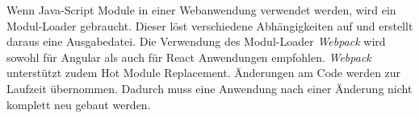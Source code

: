 \label{Webpack}
Wenn Java-Script Module in einer Webanwendung verwendet werden, wird ein Modul-Loader gebraucht. Dieser löst verschiedene Abhängigkeiten auf und erstellt daraus eine Ausgabedatei. Die Verwendung des Modul-Loader \textit{Webpack} wird sowohl für Angular als auch für React Anwendungen empfohlen. \textit{Webpack} unterstützt zudem Hot Module Replacement. Änderungen am Code werden zur Laufzeit übernommen. Dadurch muss eine Anwendung nach einer Änderung nicht komplett neu gebaut werden.\autocites[vgl.][13,21]{Woiwode.2018}[vgl.][9,295-301]{Zeigermann.2016}[vgl.][]{Hlushko.2018}

